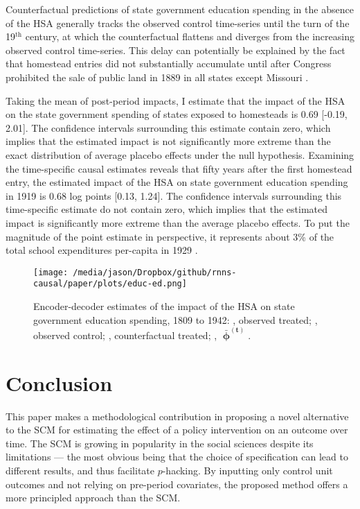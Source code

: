 Counterfactual predictions of state government education spending in the absence of the HSA generally tracks the observed control time-series until the turn of the 19$^\text{th}$ century, at which the counterfactual flattens and diverges from the increasing observed control time-series. This delay can potentially be explained by the fact that homestead entries did not substantially accumulate until after Congress prohibited the sale of public land in 1889 in all states except Missouri \citep{gates1941land,gates1979federal}. 

Taking the mean of post-period impacts, I estimate that the impact of the HSA on the state government spending of states exposed to homesteads is 0.69 [-0.19, 2.01]. The confidence intervals surrounding this estimate contain zero, which implies that the estimated impact is not significantly more extreme than the exact distribution of average placebo effects under the null hypothesis. Examining the time-specific causal estimates reveals that fifty years after the first homestead entry, the estimated impact of the HSA on state government education spending in 1919 is 0.68 log points [0.13, 1.24]. The confidence intervals surrounding this time-specific estimate do not contain zero, which implies that the estimated impact is significantly more extreme than the average placebo effects. To put the magnitude of the point estimate in perspective, it represents about 3\% of the total school expenditures per-capita in 1929 \citep{snyder2010digest}.

\begin{figure}[htbp]
	\centering
	\texttt{[image: /media/jason/Dropbox/github/rnns-causal/paper/plots/educ-ed.png]}
	\caption{Encoder-decoder estimates of the impact of the HSA on state government education spending, 1809 to 1942:		{\color{Darjeeling15}{\sampleline{}}}, observed treated;
		{}, observed control;
		{}, counterfactual treated;
		{}, $\boldsymbol{\bar{\upphi}^{(t)}}$.\label{educ-ed}} 
\end{figure}

\section{Conclusion} \label{ch3-conclusion}

This paper makes a methodological contribution in proposing a novel alternative to the SCM for estimating the effect of a policy intervention on an outcome over time. The SCM is growing in popularity in the social sciences despite its limitations --- the most obvious being that the choice of specification can lead to different results, and thus facilitate $p$-hacking. By inputting only control unit outcomes and not relying on pre-period covariates, the proposed method offers a more principled approach than the SCM. 

